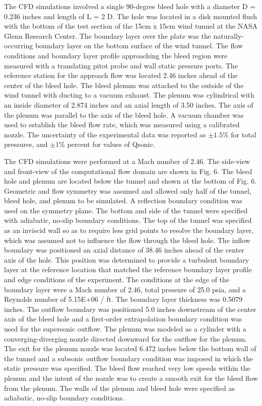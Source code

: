 \documentclass{article}
\begin{document}
The CFD simulations involved a single 90-degree bleed hole with a diameter D = 0.236 inches and length of L = 2 D. The hole was located in a disk mounted flush with the bottom of the test section of the 15cm x 15cm wind tunnel at the NASA Glenn Research Center. The boundary layer over the plate was the naturally-occurring boundary layer on the bottom surface of the wind tunnel. The flow conditions and boundary layer profile approaching the bleed region were measured with a translating pitot probe and wall static pressure ports. The reference station for the approach flow was located 2.46 inches ahead of the center of the bleed hole. The bleed plenum was attached to the outside of the wind tunnel with ducting to a vacuum exhaust. The plenum was cylindrical with an inside diameter of 2.874 inches and an axial length of 3.50 inches. The axis of the plenum was parallel to the axis of the bleed hole. A vacuum chamber was used to establish the bleed flow rate, which was measured using a calibrated nozzle. The uncertainty of the experimental data was reported as $\pm1.5 \%$ for total pressures, and $\pm 1 \%$ percent for values of Qsonic. 

The CFD simulations were performed at a Mach number of 2.46. The side-view and front-view of the computational flow domain are shown in Fig. 6. The bleed hole and plenum are located below the tunnel and shown at the bottom of Fig. 6. Geometric and flow symmetry was assumed and allowed only half of the tunnel, bleed hole, and plenum to be simulated. A reflection boundary condition was used on the symmetry plane. The bottom and side of the tunnel were specified with adiabatic, no-slip boundary conditions. The top of the tunnel was specified as an inviscid wall so as to require less grid points to resolve the boundary layer, which was assumed not to influence the flow through the bleed hole. The inflow boundary was positioned an axial distance of 38.46 inches ahead of the center axis of the hole. This position was determined to provide a turbulent boundary layer at the reference location that matched the reference boundary layer profile and edge conditions of the experiment. The  conditions at the edge of the boundary layer were a Mach number of 2.46, total pressure of 25.0 psia, and a Reynolds number of 5.15E+06 / ft. The boundary layer thickness was 0.5079 inches. The outflow boundary was positioned 5.0 inches downstream of the center axis of the bleed hole and a first-order extrapolation boundary condition was used for the supersonic outflow. The plenum was modeled as a cylinder with a converging-diverging nozzle directed downward for the outflow for the plenum. The exit for the plenum nozzle was located 6.472 inches below the bottom wall of the tunnel and a subsonic outflow boundary condition was imposed in which the static pressure was specified. The bleed flow reached very low speeds within the plenum and the intent of the nozzle was to create a smooth exit for the bleed flow from the plenum. The walls of the plenum and bleed hole were specified as adiabatic, no-slip boundary conditions.
\end{document}
